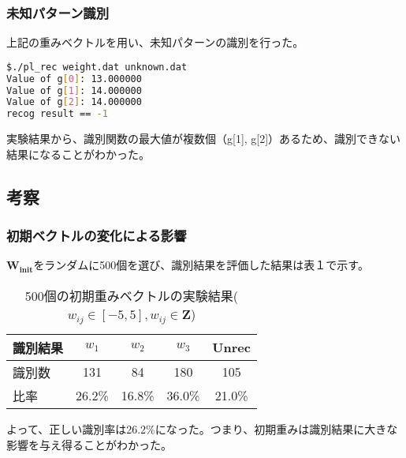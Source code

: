 \documentclass[ %
  uplatex,%
  papersize%
]{jsarticle}
\begin{document}
\subsubsection{未知パターン識別}
上記の重みベクトルを用い、未知パターンの識別を行った。
\begin{lstlisting}[language=bash]
$./pl_rec weight.dat unknown.dat
Value of g[0]: 13.000000
Value of g[1]: 14.000000
Value of g[2]: 14.000000
recog result == -1
\end{lstlisting}
実験結果から、識別関数の最大値が複数個（g[1], g[2]）あるため、識別できない結果になることがわかった。

\subsection{考察}
\subsubsection{初期ベクトルの変化による影響}
$\bm{W_{init}}$をランダムに500個を選び、識別結果を評価した結果は表１で示す。

\begin{table}[h]\small
\centering
\caption{500個の初期重みベクトルの実験結果($w_{ij}\in[-5, 5] , w_{ij} \in \bm{Z}$)}
\label{table}
\begin{tabular}{|l|c|c|c|c|} 
\hline  
識別結果 & ${w_{1}}$ & ${w_{2}}$ & ${w_{3}}$ & Unrec  \\
\hline
識別数 & 131 & 84 & 180 & 105 \\
\hline
比率 & 26.2\% & 16.8\% & 36.0\% & 21.0\%\\
\hline                       
\end{tabular} 
\end{table}

よって、正しい識別率は26.2\%になった。つまり、初期重みは識別結果に大きな影響を与え得ることがわかった。
\end{document}

